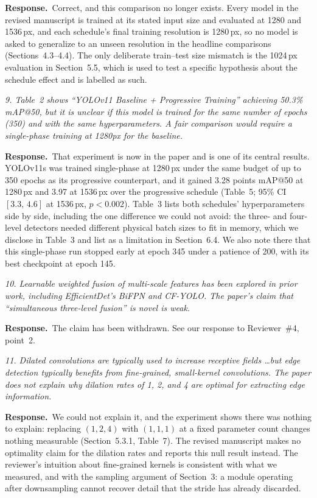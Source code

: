 \documentclass[11pt, a4paper]{article}
\newcommand{\point}[1]{\medskip\noindent\textit{#1}\par}
\newcommand{\reply}{\textbf{Response.}\ }
\begin{document}
\reply Correct, and this comparison no longer exists. Every model in the revised
manuscript is trained at its stated input size and evaluated at 1280 and
1536\,px, and each schedule's final training resolution is 1280\,px, so no model
is asked to generalize to an unseen resolution in the headline comparisons
(Sections~4.3--4.4). The only deliberate train--test size mismatch is the 1024\,px
evaluation in Section~5.5, which is used to test a specific hypothesis about the
schedule effect and is labelled as such.

\point{9. Table~2 shows ``YOLOv11 Baseline + Progressive Training'' achieving
50.3\% mAP@50, but it is unclear if this model is trained for the same number of
epochs (350) and with the same hyperparameters. A fair comparison would require a
single-phase training at 1280px for the baseline.}

\reply That experiment is now in the paper and is one of its central results.
YOLOv11s was trained single-phase at 1280\,px under the same budget of up to 350
epochs as its progressive counterpart, and it gained 3.28 points mAP@50 at
1280\,px and 3.97 at 1536\,px over the progressive schedule (Table~5; 95\% CI
$[3.3,\,4.6]$ at 1536\,px, $p<0.002$). Table~3 lists both schedules'
hyperparameters side by side, including the one difference we could not avoid: the
three- and four-level detectors needed different physical batch sizes to fit in
memory, which we disclose in Table~3 and list as a limitation in Section~6.4. We
also note there that this single-phase run stopped early at epoch 345 under a
patience of 200, with its best checkpoint at epoch 145.

\point{10. Learnable weighted fusion of multi-scale features has been explored in
prior work, including EfficientDet's BiFPN and CF-YOLO. The paper's claim that
``simultaneous three-level fusion'' is novel is weak.}

\reply The claim has been withdrawn. See our response to Reviewer~\#4, point~2.

\point{11. Dilated convolutions are typically used to increase receptive fields
\dots but edge detection typically benefits from fine-grained, small-kernel
convolutions. The paper does not explain why dilation rates of 1, 2, and 4 are
optimal for extracting edge information.}

\reply We could not explain it, and the experiment shows there was nothing to
explain: replacing $(1,2,4)$ with $(1,1,1)$ at a fixed parameter count changes
nothing measurable (Section~5.3.1, Table~7). The revised manuscript makes no
optimality claim for the dilation rates and reports this null result instead. The
reviewer's intuition about fine-grained kernels is consistent with what we
measured, and with the sampling argument of Section~3: a module operating after
downsampling cannot recover detail that the stride has already discarded.
\end{document}
